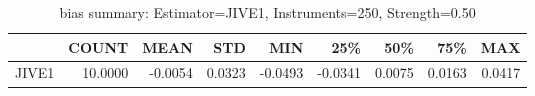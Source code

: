 \begin{table}[ht]
\centering
\caption{bias summary: Estimator=JIVE1, Instruments=250, Strength=0.50}
\begin{tabular}{lrrrrrrrr}
\toprule
 & COUNT & MEAN & STD & MIN & 25\% & 50\% & 75\% & MAX \\
\midrule
JIVE1 & 10.0000 & -0.0054 & 0.0323 & -0.0493 & -0.0341 & 0.0075 & 0.0163 & 0.0417 \\
\bottomrule
\end{tabular}
\end{table}
